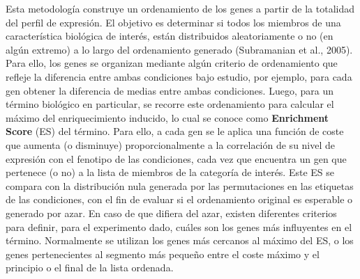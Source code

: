 \documentclass[12pt,twoside]{reedthesis}
\begin{document}
Esta metodología construye un ordenamiento de los genes a partir de la totalidad del perfil de expresión. El objetivo es determinar si todos los miembros de una característica biológica de interés, están distribuidos aleatoriamente o no (en algún extremo) a lo largo del ordenamiento generado (Subramanian et al., 2005). Para ello, los genes se organizan mediante algún criterio de ordenamiento que refleje la diferencia entre ambas condiciones bajo estudio, por ejemplo, para cada gen obtener la diferencia de medias entre ambas condiciones. Luego, para un término biológico en particular, se recorre este ordenamiento para calcular el máximo del enriquecimiento inducido, lo cual se conoce como \textbf{Enrichment Score} (ES) del término. Para ello, a cada gen se le aplica una función de coste que aumenta (o disminuye) proporcionalmente a la correlación de su nivel de expresión con el fenotipo de las condiciones, cada vez que encuentra un gen que pertenece (o no) a la lista de miembros de la categoría de interés. Este ES se compara con la distribución nula generada por las permutaciones en las etiquetas de las condiciones, con el fin de evaluar si el ordenamiento original es esperable o generado por azar. En caso de que difiera del azar, existen diferentes criterios para definir, para el experimento dado, cuáles son los genes más influyentes en el término. Normalmente se utilizan los genes más cercanos al máximo del ES, o los genes pertenecientes al segmento más pequeño entre el coste máximo y el principio o el final de la lista ordenada.

\par
\end{document}
